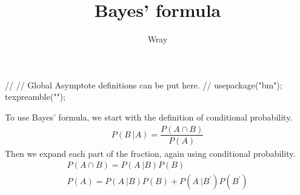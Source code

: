\documentclass[12pt]{exam}
\title{Bayes' formula}
\author{Wray}
\begin{document}
\begin{asydef}
//
// Global Asymptote definitions can be put here.
//
usepackage("bm");
texpreamble("\def\V#1{\bm{#1}}");
\end{asydef}

\bigskip
\bigskip

To use Bayes' formula, we start with the definition of conditional probability.
\begin{gather*}
P(B \> \vert A) = \dfrac{P(A \cap B)}{P(A)}
\end{gather*}
Then we expand each part of the fraction, again using conditional probability.
\begin{gather*}
P(A \cap B) = P(A \> \vert B) P(B) \\
P(A) = P(A \> \vert B) P(B) + P(A \> \vert B^{\prime}) P(B^{\prime})
\end{gather*}
\end{document}
